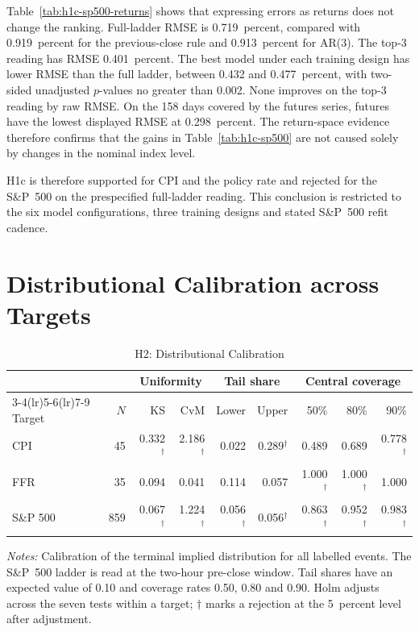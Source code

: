 \documentclass[12pt,a4paper]{report}
\newcommand{\tablenote}[1]{%
  \par\vspace{0.4em}%
  \begin{minipage}{0.9\textwidth}%
  \footnotesize\raggedright\emph{Notes:} #1%
  \end{minipage}%
}
\begin{document}
Table~\ref{tab:h1c-sp500-returns} shows that expressing errors as returns does
not change the ranking. Full-ladder RMSE is 0.719~percent, compared with
0.919~percent for the previous-close rule and 0.913~percent for AR(3). The
top-3 reading has RMSE 0.401~percent. The best model under each training design
has lower RMSE than the full ladder, between 0.432 and 0.477~percent, with
two-sided unadjusted $p$-values no greater than 0.002. None improves on the
top-3 reading by raw RMSE. On the 158 days covered by the futures series,
futures have the lowest displayed RMSE at 0.298~percent. The return-space
evidence therefore confirms that the gains in Table~\ref{tab:h1c-sp500} are
not caused solely by changes in the nominal index level.

H1c is therefore supported for CPI and the policy rate and rejected for the
S\&P~500 on the prespecified full-ladder reading. This conclusion is restricted
to the six model configurations, three training designs and stated S\&P~500
refit cadence.


\section{Distributional Calibration across Targets}
\label{sec:results-h2}

\begin{table}[htbp]
\centering
\caption{H2: Distributional Calibration}
\label{tab:h2}
\small
\begin{tabular}{@{}lrrrrrrrr@{}}
\toprule
 & & \multicolumn{2}{c}{Uniformity} & \multicolumn{2}{c}{Tail share}
 & \multicolumn{3}{c}{Central coverage} \\
\cmidrule(lr){3-4}\cmidrule(lr){5-6}\cmidrule(lr){7-9}
Target & $N$ & KS & CvM & Lower & Upper & 50\% & 80\% & 90\% \\
\midrule
CPI & 45 & 0.332$^\dagger$ & 2.186$^\dagger$ & 0.022 & 0.289$^\dagger$
 & 0.489 & 0.689 & 0.778$^\dagger$ \\
FFR & 35 & 0.094 & 0.041 & 0.114 & 0.057
 & 1.000$^\dagger$ & 1.000$^\dagger$ & 1.000 \\
S\&P 500 & 859 & 0.067$^\dagger$ & 1.224$^\dagger$ & 0.056$^\dagger$ & 0.056$^\dagger$
 & 0.863$^\dagger$ & 0.952$^\dagger$ & 0.983$^\dagger$ \\
\bottomrule
\end{tabular}
\tablenote{Calibration of the terminal implied distribution for all labelled
events. The S\&P~500 ladder is read at the two-hour pre-close window. Tail
shares have an expected value of 0.10 and coverage rates 0.50, 0.80 and 0.90.
Holm adjusts across the seven tests within a target; $\dagger$ marks a
rejection at the 5~percent level after adjustment.}
\end{table}
\end{document}
